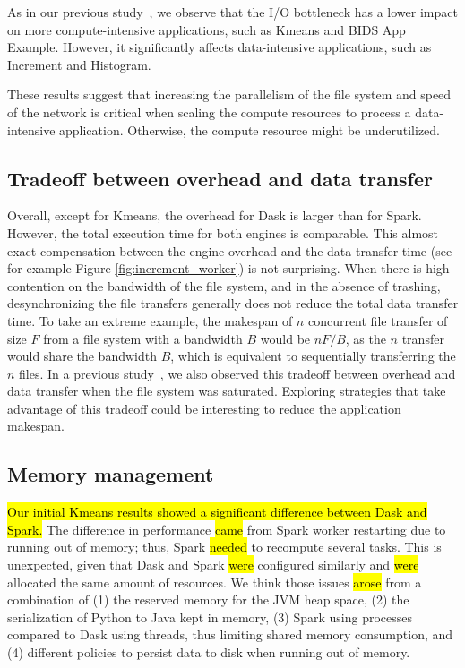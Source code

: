 \documentclass[AMA,STIX1COL]{WileyNJD-v2}
\newcommand{\HL}[1]{\hl{#1}}
\begin{document}
As in our previous study~{\cite{8943502}}, we observe that the I/O bottleneck has a lower impact on more compute-intensive applications, such as Kmeans and BIDS App Example.
However, it significantly affects data-intensive applications, such as Increment and Histogram.
							
							
These results suggest that increasing the parallelism of the file system and speed of the network is critical when scaling the compute resources to process a data-intensive application.
Otherwise, the compute resource might be underutilized.
							
\subsection{Tradeoff between overhead and data transfer}
\label{subsec:overhead-tradeoff}
Overall, except for Kmeans, the overhead for Dask is larger than for Spark.
However, the total execution time for both engines is comparable.
This almost exact compensation between the engine overhead and the data transfer time (see for example Figure \ref{fig:increment_worker}) is not surprising.
When there is high contention on the bandwidth of the file system, and in the absence of trashing, desynchronizing the file transfers generally does not reduce the total data transfer time.
To take an extreme example, the makespan of $n$ concurrent file transfer of size $F$ from a file system with a bandwidth $B$ would be $nF/B$,
as the $n$ transfer would share the bandwidth $B$, which is equivalent to sequentially transferring the $n$ files.
In a previous study~\cite{8943502}, we also observed this tradeoff between overhead and data transfer when the file system was saturated.
Exploring strategies that take advantage of this tradeoff could be interesting to reduce the application makespan.
																	
\subsection{Memory management}
\HL{Our initial Kmeans results showed a significant difference between Dask and Spark.}
The difference in performance \HL{came} from Spark worker restarting due to running out of memory; thus, Spark \HL{needed} to recompute several tasks.
This is unexpected, given that Dask and Spark \HL{were} configured similarly and \HL{were} allocated the same amount of resources.
We think those issues \HL{arose} from a combination of
(1) the reserved memory for the JVM heap space,
(2) the serialization of Python to Java kept in memory,
(3) Spark using processes compared to Dask using threads, thus limiting shared memory consumption,
and (4) different policies to persist data to disk when running out of memory.
							
\end{document}

